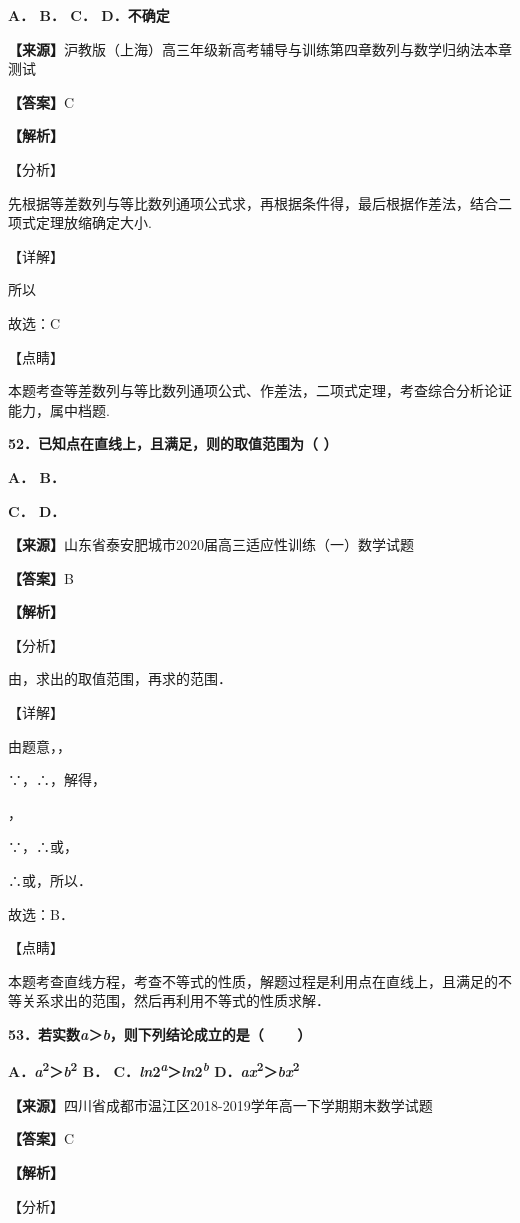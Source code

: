 \documentclass[
]{article}
\begin{document}
\textbf{A． B． C． D．不确定}

\textbf{【来源】}沪教版（上海）高三年级新高考辅导与训练第四章数列与数学归纳法本章测试

\textbf{【答案】}C

\textbf{【解析】}

【分析】

先根据等差数列与等比数列通项公式求，再根据条件得，最后根据作差法，结合二项式定理放缩确定大小.

【详解】

所以

故选：C

【点睛】

本题考查等差数列与等比数列通项公式、作差法，二项式定理，考查综合分析论证能力，属中档题.

\textbf{52．已知点在直线上，且满足，则的取值范围为（ ）}

\textbf{A． B．}

\textbf{C． D．}

\textbf{【来源】}山东省泰安肥城市2020届高三适应性训练（一）数学试题

\textbf{【答案】}B

\textbf{【解析】}

【分析】

由，求出的取值范围，再求的范围．

【详解】

由题意，，

∵，∴，解得，

，

∵，∴或，

∴或，所以．

故选：B．

【点睛】

本题考查直线方程，考查不等式的性质，解题过程是利用点在直线上，且满足的不等关系求出的范围，然后再利用不等式的性质求解．

\textbf{53．若实数\emph{a}＞\emph{b}，则下列结论成立的是（ 　　）}

\textbf{A．\emph{a}\textsuperscript{2}＞\emph{b}\textsuperscript{2} B．
C．\emph{ln}2\emph{\textsuperscript{a}}＞\emph{ln}2\emph{\textsuperscript{b}}
D．\emph{ax}\textsuperscript{2}＞\emph{bx}\textsuperscript{2}}

\textbf{【来源】}四川省成都市温江区2018-2019学年高一下学期期末数学试题

\textbf{【答案】}C

\textbf{【解析】}

【分析】
\end{document}
